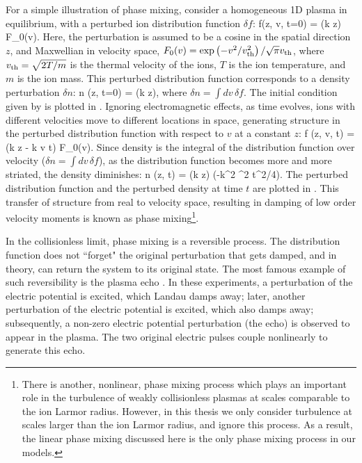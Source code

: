      For a simple illustration of phase mixing, consider a
     homogeneous 1D plasma in equilibrium, with a perturbed ion distribution function
     $\delta f$: 
     \beq
        \delta f(z, v, t=0) = \cos(k z) F_0(v). \label{intro:eq:df:0}
     \eeq
     Here, the perturbation is assumed to be a cosine in the spatial direction $z$, and
     Maxwellian in velocity space, $F_0(v) = \exp\left(-v^2/v_{\rm th}^2\right)/\sqrt{\pi}v_{\rm th}$, where
     $v_{\rm th}=\sqrt{2T/m}$ is the thermal velocity of the ions, $T$ is the ion temperature,
     and $m$ is the ion mass.
     This perturbed distribution function corresponds to a density perturbation $\delta n$: 
     \beq
        \delta n (z, t=0)  = \cos(k z), \label{intro:eq:dn:0}
     \eeq
     where $\delta n = \int dv\, \delta f$. The initial condition given by
      is plotted in
     .
     Ignoring electromagnetic effects, as time evolves, ions with different
     velocities move to different locations in space, generating structure in the
     perturbed distribution function with respect to $v$ at a
     constant $z$:
     \beq
        \delta f (z, v, t) = \cos(k z - k v t) F_0(v). \label{intro:eq:df:t}
     \eeq
     Since density is the integral of the distribution
     function over velocity ($\delta n = \int dv\, \delta f$), as the distribution function becomes more and more striated, the
     density diminishes: 
     \beq
        \delta n (z, t) = \cos(k z) \exp\lt(-k^2 \vth^2 t^2/4\rt). \label{intro:eq:dn:t}
     \eeq
     The perturbed distribution function and the perturbed density at time $t$ are plotted
     in .
     This transfer of structure from real to velocity space, resulting in damping of low
     order velocity moments
     is known as phase mixing\footnote{There is another, nonlinear, phase mixing process
     \cite{tatsuno09}
     which plays an important role in the turbulence of weakly collisionless plasmas at scales
     comparable to the ion Larmor radius. 
      However, in
     this thesis we only consider turbulence at scales larger than the ion Larmor radius, and ignore
     this process. As a result, the linear phase mixing discussed here is the only phase mixing process in
     our models.}.

     In the collisionless limit, phase mixing is a reversible process. 
     The distribution function does not ``forget" the original perturbation that gets
     damped, and in theory, can return the system to its original state. The most famous
     example of such reversibility is the plasma echo \cite{gould67, malmberg68,
     malmberg68b, su68}. In these experiments, a perturbation of the electric potential is
     excited, which Landau damps away; later, another perturbation of the electric
     potential is excited, which also damps away; subsequently, a non-zero electric
     potential perturbation (the echo) is observed to appear in the
     plasma. The two original electric pulses couple nonlinearly to generate this echo.

